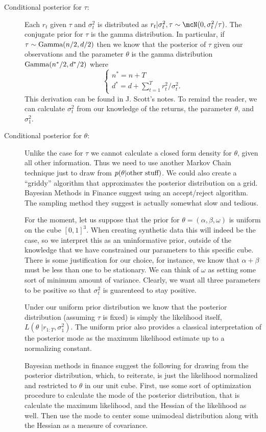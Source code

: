 \documentclass{article}
\begin{document}
\begin{description}
\item[Conditional posterior for $\tau$:]  Each $r_t$ given $\tau$ and $\sigma_t^2$ is distributed as $r_t | \sigma_t^2, \tau \sim \mcN(0, \sigma_t^2 / \tau)$.  The conjugate prior for $\tau$ is the gamma distribution.  In particular, if $\tau \sim \textmd{Gamma}(n/2,d/2)$ then we know that the posterior of $\tau$ given our observations and the parameter $\theta$ is the gamma distribution $\textmd{Gamma}(n^*/2, d^*/2)$ where
\[
\begin{cases}
n^* = n + T \\
d^* = d + \sum_{t=1}^T r_t^2/\sigma_t^2.
\end{cases}
\]
This derivation can be found in J. Scott's notes.  To remind the reader, we can calculate $\sigma_t^2$ from our knowledge of the returns, the parameter $\theta$, and $\sigma_1^2$.

\item[Conditional posterior for $\theta$:]  Unlike the case for $\tau$ we cannot calculate a closed form density for $\theta$, given all other information.  Thus we need to use another Markov Chain technique just to draw from $p(\theta | \textmd{other stuff})$.  We could also create a ``griddy'' algorithm that approximates the posterior distribution on a grid.  Bayesian Methods in Finance suggest using an accept/reject algorithm.  The sampling method they suggest is actually somewhat slow and tedious.

For the moment, let us suppose that the prior for $\theta = (\alpha, \beta, \omega)$ is uniform on the cube $[0,1]^3$.  When creating synthetic data this will indeed be the case, so we interpret this as an uninformative prior, outside of the knowledge that we have constrained our parameters to this specific cube.  There is some justification for our choice, for instance, we know that $\alpha + \beta$ must be less than one to be stationary.  We can think of $\omega$ as setting some sort of minimum amount of variance.  Clearly, we want all three parameters to be positive so that $\sigma_t^2$ is guarenteed to stay positive.

Under our uniform prior distribution we know that the posterior distribution (assuming $\tau$ is fixed) is simply the likelihood itself, $L(\theta \; | r_{1:T}, \sigma_1^2)$.  The uniform prior also provides a classical interpretation of the posterior mode as the maximum likelihood estimate up to a normalizing constant.

Bayesian methods in finance suggest the following for drawing from the posterior distribution, which, to reiterate, is just the likelihood normalized and restricted to $\theta$ in our unit cube.  First, use some sort of optimization procedure to calculate the mode of the posterior distribution, that is calculate the maximum likelihood, and the Hessian of the likelihood as well.  Then use the mode to center some unimodeal distribution along with the Hessian as a measure of covariance.


\end{description}
\end{document}
